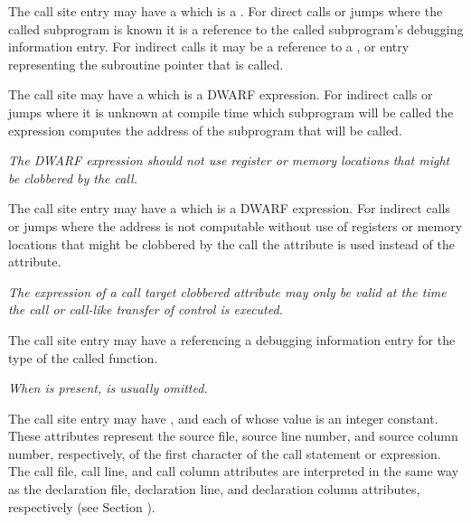 The call site entry may have a 
\DWATcalloriginDEFN{}
which is a \CLASSreference.  For direct calls or jumps where the called 
subprogram is known it is a reference to the called subprogram's debugging
information entry.  For indirect calls it may be a reference to a
\DWTAGvariable{}, \DWTAGformalparameter{} or \DWTAGmember{} entry representing
the subroutine pointer that is called.

The call site may have a 
\DWATcalltargetDEFN{}
 which is
a DWARF expression.  For indirect calls or jumps where it is unknown at
compile time which subprogram will be called the expression computes the
address of the subprogram that will be called.  

\textit{The DWARF expression should
not use register or memory locations that might be clobbered by the call.}

The call site entry may have a 
\DWATcalltargetclobberedDEFN{}
which is a DWARF expression.  For indirect calls or jumps where the
address is not computable without use of registers or memory locations that
might be clobbered by the call the \DWATcalltargetclobberedNAME{}
attribute is used instead of the \DWATcalltarget{} attribute.

\textit{The expression of a call target clobbered attribute may only be 
valid at the time the call or call-like transfer of control is executed.}

The call site entry may have a \DWATtypeDEFN{}
referencing a debugging information entry for the type of the called function.  

\textit{When \DWATcallorigin{} is present, \DWATtypeNAME{} is usually omitted.}

The call site entry may have 
\DWATcallfileDEFN{}, 
\DWATcalllineDEFN{} and 
\DWATcallcolumnDEFN{} 
each of whose value is an integer constant.
These attributes represent the source file, source line number, and source
column number, respectively, of the first character of the call statement or
expression.  The call file, call line, and call column attributes are
interpreted in the same way as the declaration file, declaration
line, and declaration column attributes, respectively 
(see Section ).


